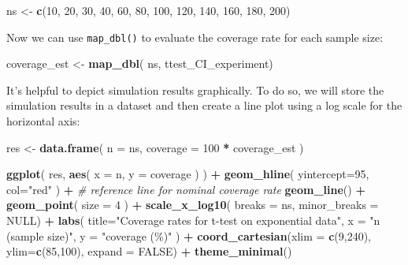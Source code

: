 \documentclass[
]{book}
\newenvironment{Shaded}{\begin{snugshade}}{\end{snugshade}}
\newcommand{\AttributeTok}[1]{\textcolor[rgb]{0.13,0.29,0.53}{#1}}
\newcommand{\CommentTok}[1]{\textcolor[rgb]{0.56,0.35,0.01}{\textit{#1}}}
\newcommand{\ConstantTok}[1]{\textcolor[rgb]{0.56,0.35,0.01}{#1}}
\newcommand{\DecValTok}[1]{\textcolor[rgb]{0.00,0.00,0.81}{#1}}
\newcommand{\FunctionTok}[1]{\textcolor[rgb]{0.13,0.29,0.53}{\textbf{#1}}}
\newcommand{\NormalTok}[1]{#1}
\newcommand{\OtherTok}[1]{\textcolor[rgb]{0.56,0.35,0.01}{#1}}
\newcommand{\SpecialCharTok}[1]{\textcolor[rgb]{0.81,0.36,0.00}{\textbf{#1}}}
\newcommand{\StringTok}[1]{\textcolor[rgb]{0.31,0.60,0.02}{#1}}
\begin{document}
\begin{Shaded}
\begin{Highlighting}[]
\NormalTok{ns }\OtherTok{\textless{}{-}} \FunctionTok{c}\NormalTok{(}\DecValTok{10}\NormalTok{, }\DecValTok{20}\NormalTok{, }\DecValTok{30}\NormalTok{, }\DecValTok{40}\NormalTok{, }\DecValTok{60}\NormalTok{, }\DecValTok{80}\NormalTok{, }\DecValTok{100}\NormalTok{, }\DecValTok{120}\NormalTok{, }\DecValTok{140}\NormalTok{, }\DecValTok{160}\NormalTok{, }\DecValTok{180}\NormalTok{, }\DecValTok{200}\NormalTok{)}
\end{Highlighting}
\end{Shaded}

Now we can use \texttt{map\_dbl()} to evaluate the coverage rate for each sample size:

\begin{Shaded}
\begin{Highlighting}[]
\NormalTok{coverage\_est }\OtherTok{\textless{}{-}} \FunctionTok{map\_dbl}\NormalTok{( ns, ttest\_CI\_experiment)}
\end{Highlighting}
\end{Shaded}

It's helpful to depict simulation results graphically.
To do so, we will store the simulation results in a dataset and then create a line plot using a log scale for the horizontal axis:

\begin{Shaded}
\begin{Highlighting}[]
\NormalTok{res }\OtherTok{\textless{}{-}} \FunctionTok{data.frame}\NormalTok{( }
  \AttributeTok{n =}\NormalTok{ ns, }
  \AttributeTok{coverage =} \DecValTok{100} \SpecialCharTok{*}\NormalTok{ coverage\_est }
\NormalTok{)}

\FunctionTok{ggplot}\NormalTok{( res, }\FunctionTok{aes}\NormalTok{( }\AttributeTok{x =}\NormalTok{ n, }\AttributeTok{y =}\NormalTok{ coverage ) ) }\SpecialCharTok{+}
  \FunctionTok{geom\_hline}\NormalTok{( }\AttributeTok{yintercept=}\DecValTok{95}\NormalTok{, }\AttributeTok{col=}\StringTok{"red"}\NormalTok{ ) }\SpecialCharTok{+}   \CommentTok{\# reference line for nominal coverage rate}
  \FunctionTok{geom\_line}\NormalTok{() }\SpecialCharTok{+} 
  \FunctionTok{geom\_point}\NormalTok{( }\AttributeTok{size =} \DecValTok{4}\NormalTok{ ) }\SpecialCharTok{+}
  \FunctionTok{scale\_x\_log10}\NormalTok{( }\AttributeTok{breaks =}\NormalTok{ ns, }\AttributeTok{minor\_breaks =} \ConstantTok{NULL}\NormalTok{) }\SpecialCharTok{+}
  \FunctionTok{labs}\NormalTok{( }
    \AttributeTok{title=}\StringTok{"Coverage rates for t{-}test on exponential data"}\NormalTok{,}
    \AttributeTok{x =} \StringTok{"n (sample size)"}\NormalTok{, }
    \AttributeTok{y =} \StringTok{"coverage (\%)"} 
\NormalTok{  ) }\SpecialCharTok{+}
  \FunctionTok{coord\_cartesian}\NormalTok{(}\AttributeTok{xlim =} \FunctionTok{c}\NormalTok{(}\DecValTok{9}\NormalTok{,}\DecValTok{240}\NormalTok{), }\AttributeTok{ylim=}\FunctionTok{c}\NormalTok{(}\DecValTok{85}\NormalTok{,}\DecValTok{100}\NormalTok{), }\AttributeTok{expand =} \ConstantTok{FALSE}\NormalTok{) }\SpecialCharTok{+} 
  \FunctionTok{theme\_minimal}\NormalTok{()}
\end{Highlighting}
\end{Shaded}
\end{document}
